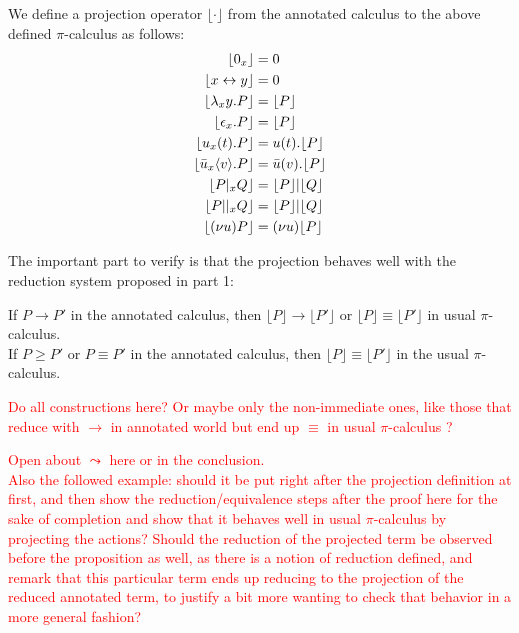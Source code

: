 \begin{definition}
We define a projection operator $\lfloor\cdot\rfloor$ from the annotated calculus to the above defined $\pi$-calculus as follows:\\
\begin{align*}
\lfloor 0_x \rfloor &= 0 \\
\lfloor x \leftrightarrow y \rfloor &= 0 \\
\lfloor \lambda_xy.P \rfloor &= \lfloor P \rfloor \\
\lfloor \epsilon_x.P \rfloor &= \lfloor P \rfloor \\
\lfloor u_x(t).P \rfloor &= u(t).\lfloor P \rfloor \\
\lfloor \bar{u}_x\langle v\rangle.P \rfloor &= \bar{u}(v).\lfloor P \rfloor \\
\lfloor P |_x Q \rfloor &= \lfloor P \rfloor | \lfloor Q \rfloor \\
\lfloor P ||_x Q \rfloor &= \lfloor P \rfloor | \lfloor Q \rfloor \\
\lfloor (\nu u)P \rfloor &= (\nu u)\lfloor P \rfloor
\end{align*}
\end{definition}

The important part to verify is that the projection behaves well with the reduction system proposed in part 1:

\begin{proposition}
If $P \to P'$ in the annotated calculus, then $\lfloor P \rfloor \to \lfloor P' \rfloor$ or $\lfloor P \rfloor \equiv \lfloor P' \rfloor$ in usual $\pi$-calculus.\\
If $P \geq P'$ or $P \equiv P'$ in the annotated calculus, then $\lfloor P \rfloor \equiv \lfloor P' \rfloor$ in the usual $\pi$-calculus.
\end{proposition}

\begin{myproof}
\textcolor{red}{Do all constructions here? Or maybe only the non-immediate ones, like those that reduce with $\to$ in annotated world but end up $\equiv$ in usual $\pi$-calculus ?} %
\end{myproof}

\textcolor{red}{Open about $\leadsto$ here or in the conclusion.\\
Also the followed example: should it be put right after the projection definition at first, and then show the reduction/equivalence steps after the proof here for the sake of completion and show that it behaves well in usual $\pi$-calculus by projecting the actions? Should the reduction of the projected term be observed before the proposition as well, as there is a notion of reduction defined, and remark that this particular term ends up reducing to the projection of the reduced annotated term, to justify a bit more wanting to check that behavior in a more general fashion?} %